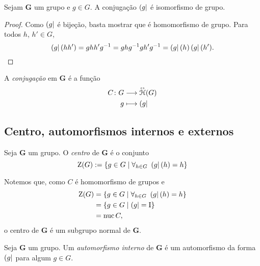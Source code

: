\begin{proposition}
Sejam $\bm G$ um grupo e $g \in G$. A conjugação $\left({g}\right|$ é isomorfismo de grupo.
\end{proposition}
\begin{proof}
Como $\left({g}\right|$ é bijeção, basta mostrar que é homomorfismo de gru\-po. Para todos $h$, $h' \in G$,
	\begin{equation*}
		\left({g}\right|(hh') = ghh'g^{-1} = ghg^{-1} gh'g^{-1} = \left({g}\right|(h)\left({g}\right|(h').
	\end{equation*}
\end{proof}

A \emph{conjugação} em $\bm G$ é a função
	\begin{align*}
		{C}\colon {G} &\longrightarrow {\accentset{\leftrightarrow}{\mathcal{H}}(G)} \\{g} &\longmapsto \left({g}\right|
	\end{align*}

%

\subsection{Centro, automorfismos internos e externos}

\begin{definition}
Seja $\bm G$ um grupo. O \emph{centro} de $\bm G$ é o conjunto
	\begin{equation*}
		\operatorname{Z}(G) := \left\{{g \in G}\;\middle\vert\;{\forall_{h \in G}\ \left({g}\right|(h)=h}\right\}
	\end{equation*}
\end{definition}


Notemos que, como $C$ é homomorfismo de grupos e
	\begin{align*}
		\operatorname{Z}(G) &= \left\{{g \in G}\;\middle\vert\;{\forall_{h \in G}\ \left({g}\right|(h) = h}\right\} \\
				&= \left\{{g \in G}\;\middle\vert\;{\left({g}\right| = \mathrm{I}}\right\} \\
				&= \operatorname{nuc}{C},
	\end{align*}
o centro de $\bm G$ é um subgrupo normal de $\bm G$.

\begin{definition}
Seja $\bm G$ um grupo. Um \emph{automorfismo interno} de $\bm G$ é um automorfismo da forma $\left({g}\right|$ para algum $g \in G$.
\end{definition}

